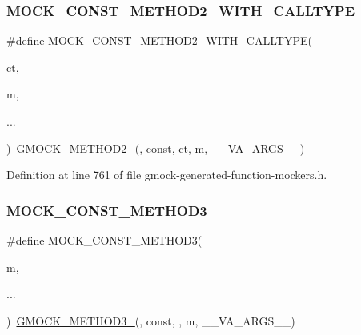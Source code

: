 \subsubsection{\texorpdfstring{M\+O\+C\+K\+\_\+\+C\+O\+N\+S\+T\+\_\+\+M\+E\+T\+H\+O\+D2\+\_\+\+W\+I\+T\+H\+\_\+\+C\+A\+L\+L\+T\+Y\+PE}{MOCK\_CONST\_METHOD2\_WITH\_CALLTYPE}}
{\footnotesize\ttfamily \#define M\+O\+C\+K\+\_\+\+C\+O\+N\+S\+T\+\_\+\+M\+E\+T\+H\+O\+D2\+\_\+\+W\+I\+T\+H\+\_\+\+C\+A\+L\+L\+T\+Y\+PE(\begin{DoxyParamCaption}\item[{}]{ct,  }\item[{}]{m,  }\item[{}]{... }\end{DoxyParamCaption})~\hyperlink{gmock-generated-function-mockers_8h_a885295ca6bebb15efb3fc786218c5d47}{G\+M\+O\+C\+K\+\_\+\+M\+E\+T\+H\+O\+D2\+\_\+}(, const, ct, m, \+\_\+\+\_\+\+V\+A\+\_\+\+A\+R\+G\+S\+\_\+\+\_\+)}



Definition at line 761 of file gmock-\/generated-\/function-\/mockers.\+h.

\mbox{\label{gmock-generated-function-mockers_8h_a9e67763df6705172e1a2ae92f1446bbc}} 
\subsubsection{\texorpdfstring{M\+O\+C\+K\+\_\+\+C\+O\+N\+S\+T\+\_\+\+M\+E\+T\+H\+O\+D3}{MOCK\_CONST\_METHOD3}}
{\footnotesize\ttfamily \#define M\+O\+C\+K\+\_\+\+C\+O\+N\+S\+T\+\_\+\+M\+E\+T\+H\+O\+D3(\begin{DoxyParamCaption}\item[{}]{m,  }\item[{}]{... }\end{DoxyParamCaption})~\hyperlink{gmock-generated-function-mockers_8h_af7c77ba511c631de02bb8c45a6ed3045}{G\+M\+O\+C\+K\+\_\+\+M\+E\+T\+H\+O\+D3\+\_\+}(, const, , m, \+\_\+\+\_\+\+V\+A\+\_\+\+A\+R\+G\+S\+\_\+\+\_\+)}



